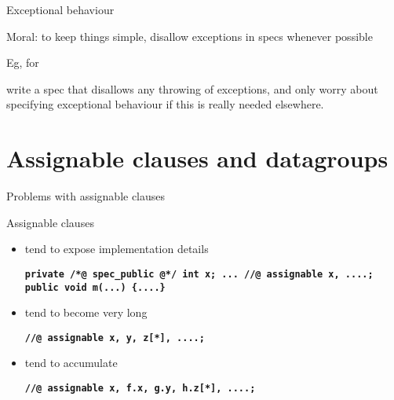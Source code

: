 \documentclass[
pdf,
nocolorBG,
slideColor,
erik,
]{prosper}
\newcommand{\code}[1]{{\rm \texttt{\textbf{\small #1}}}}
\begin{document}
\begin{slide}{Exceptional behaviour}
\vspace*{-3ex}

Moral: to keep things simple, disallow exceptions
in specs whenever possible

\bigskip

{\footnotesize
Eg, for


write a spec that disallows any throwing of exceptions, and only
worry about specifying exceptional behaviour if this is really needed
elsewhere.}

\end{slide}

\part{{\Large \red Assignable clauses and datagroups }}

\begin{slide}{Problems with assignable clauses}
\vspace*{-3ex}

Assignable clauses
\begin{itemize}
\item tend to expose implementation details
\begin{alltt}\code{\scriptsize  private /*@ spec_public @*/ int x;
  ...
  //@ assignable x, ....;
  public void m(...) \{....\} }
\end{alltt}
\item tend to become very long
\begin{alltt}\code{\scriptsize  //@ assignable x, y, z[*],  ....;}
\end{alltt}
\item tend to accumulate
\begin{alltt}\code{\scriptsize  //@ assignable x, f.x, g.y, h.z[*], ....;}
\end{alltt}
\end{itemize}
\end{slide}
\end{document}
